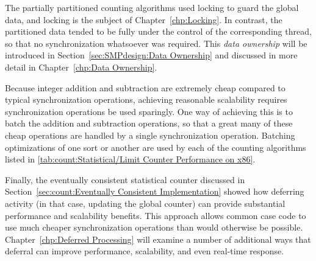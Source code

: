 \QuickQuizEnd

The partially partitioned counting algorithms used locking to
guard the global data, and locking is the subject of
Chapter~\ref{chp:Locking}.
In contrast, the partitioned data tended to be fully under the control of
the corresponding thread, so that no synchronization whatsoever was required.
This \emph{data ownership} will be introduced in
Section~\ref{sec:SMPdesign:Data Ownership}
and discussed in more detail in
Chapter~\ref{chp:Data Ownership}.

Because integer addition and subtraction are extremely cheap
compared to typical synchronization operations, achieving reasonable
scalability requires synchronization operations be used sparingly.
One way of achieving this is to batch the addition and subtraction
operations, so that a great many of these cheap operations are handled
by a single synchronization operation.
Batching optimizations of one sort or another are used by each of
the counting algorithms listed in
\cref{tab:count:Statistical/Limit Counter Performance on x86}.

Finally, the eventually consistent statistical counter discussed in
Section~\ref{sec:count:Eventually Consistent Implementation}
showed how deferring activity (in that case, updating the global
counter) can provide substantial performance and scalability benefits.
This approach allows common case code to use much cheaper synchronization
operations than would otherwise be possible.
Chapter~\ref{chp:Deferred Processing} will examine a number of additional
ways that deferral can improve performance, scalability, and even
real-time response.

